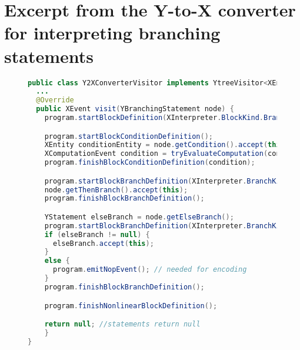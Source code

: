 \section{Excerpt from the Y-to-X converter for interpreting branching statements}
\label{apx:y2x}

\begin{figure}[H]
%
\begin{lstlisting}[language=Java]
public class Y2XConverterVisitor implements YtreeVisitor<XEntity> {
  ...
  @Override
  public XEvent visit(YBranchingStatement node) {
    program.startBlockDefinition(XInterpreter.BlockKind.Branching);

    program.startBlockConditionDefinition();
    XEntity conditionEntity = node.getCondition().accept(this);
    XComputationEvent condition = tryEvaluateComputation(conditionEntity);
    program.finishBlockConditionDefinition(condition);

    program.startBlockBranchDefinition(XInterpreter.BranchKind.Then);
    node.getThenBranch().accept(this);
    program.finishBlockBranchDefinition();

    YStatement elseBranch = node.getElseBranch();
    program.startBlockBranchDefinition(XInterpreter.BranchKind.Else);
    if (elseBranch != null) {
      elseBranch.accept(this);
    }
    else {
      program.emitNopEvent(); // needed for encoding
    }
    program.finishBlockBranchDefinition();

    program.finishNonlinearBlockDefinition();

    return null; //statements return null
    }
}
\end{lstlisting}
%
\end{figure}

\nopagebreak[4]